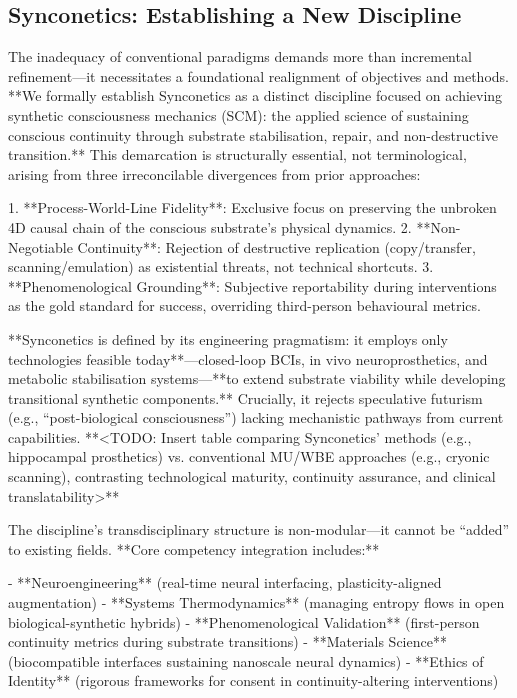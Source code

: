 \documentclass[10pt]{article}
\begin{document}
\begin{sloppypar}
  \subsection{Synconetics: Establishing a New Discipline}
  \label{sec:new-discipline}

  The inadequacy of conventional paradigms demands more than incremental refinement—it necessitates a foundational realignment of objectives and methods. **We formally establish Synconetics as a distinct discipline focused on achieving synthetic consciousness mechanics (SCM): the applied science of sustaining conscious continuity through substrate stabilisation, repair, and non-destructive transition.** This demarcation is structurally essential, not terminological, arising from three irreconcilable divergences from prior approaches:

  1. **Process-World-Line Fidelity**: Exclusive focus on preserving the unbroken 4D causal chain of the conscious substrate’s physical dynamics.
  2. **Non-Negotiable Continuity**: Rejection of destructive replication (copy/transfer, scanning/emulation) as existential threats, not technical shortcuts.
  3. **Phenomenological Grounding**: Subjective reportability during interventions as the gold standard for success, overriding third-person behavioural metrics.

  **Synconetics is defined by its engineering pragmatism: it employs only technologies feasible today**—closed-loop BCIs, in vivo neuroprosthetics, and metabolic stabilisation systems—**to extend substrate viability while developing transitional synthetic components.** Crucially, it rejects speculative futurism (e.g., “post-biological consciousness”) lacking mechanistic pathways from current capabilities. **<TODO: Insert table comparing Synconetics’ methods (e.g., hippocampal prosthetics) vs. conventional MU/WBE approaches (e.g., cryonic scanning), contrasting technological maturity, continuity assurance, and clinical translatability>**

  The discipline’s transdisciplinary structure is non-modular—it cannot be “added” to existing fields. **Core competency integration includes:**

  - **Neuroengineering** (real-time neural interfacing, plasticity-aligned augmentation)
  - **Systems Thermodynamics** (managing entropy flows in open biological-synthetic hybrids)
  - **Phenomenological Validation** (first-person continuity metrics during substrate transitions)
  - **Materials Science** (biocompatible interfaces sustaining nanoscale neural dynamics)
  - **Ethics of Identity** (rigorous frameworks for consent in continuity-altering interventions)


\end{sloppypar}
\end{document}
